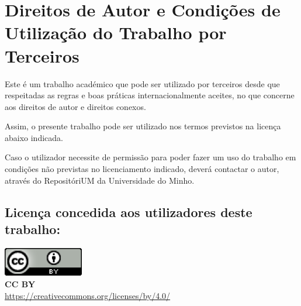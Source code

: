 \chapter*{Direitos de Autor e Condições de Utilização do Trabalho por Terceiros}
\setlength{\parskip}{1em}
\noindent
Este é um trabalho académico que pode ser utilizado por terceiros desde que respeitadas as regras e boas práticas internacionalmente aceites, no que concerne aos direitos de autor e direitos conexos.

\noindent
Assim, o presente trabalho pode ser utilizado nos termos previstos na licença abaixo indicada.

\noindent
Caso o utilizador necessite de permissão para poder fazer um uso do trabalho em condições não previstas no licenciamento indicado, deverá contactar o autor, através do RepositóriUM da Universidade do Minho.

\section*{Licença concedida aos utilizadores deste trabalho:}


\noindent
\includegraphics[]{images/CCBY.png}
\\
\textbf{CC BY}
\\
\url{https://creativecommons.org/licenses/by/4.0/}


